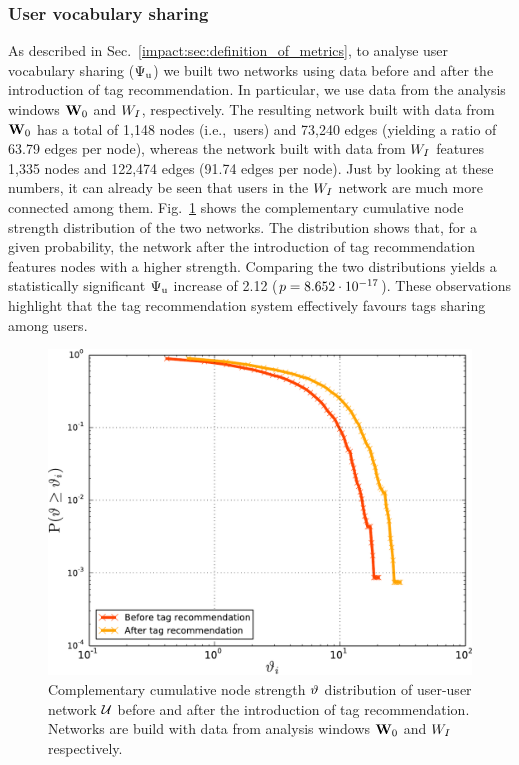 \subsubsection{User vocabulary sharing}
\label{impact:sec:vocabulary_sharing_users}
As described in Sec.~\ref{impact:sec:definition_of_metrics}, to analyse user vocabulary sharing ($\Psi_{\text{u}}$) we built two networks using data before and after the introduction of tag recommendation.
In particular, we use data from the analysis windows $\mathbf{W}_0$ and $W_I$, respectively. The resulting network built with data from $\mathbf{W}_0$ has a total of 1,148 nodes (i.e.,~users) and 73,240 edges (yielding a ratio of 63.79 edges per node), whereas the network built with data from $W_I$ features 1,335 nodes and 122,474 edges (91.74 edges per node). Just by looking at these numbers, it can already be seen that users in the $W_I$ network are much more connected among them. Fig.~\ref{impact:fig:users_graph_strength} shows the complementary cumulative node strength distribution of the two networks. The distribution shows that, for a given probability, the network after the introduction of tag recommendation features nodes with a higher strength. Comparing the two distributions yields a statistically significant $\Psi_{\text{u}}$ increase of 2.12 ($p = 8.652\cdot 10^{-17}$). 
These observations highlight that the tag recommendation system effectively favours tags sharing among users. 

\begin{figure}
\centerline{\includegraphics[width=0.66\columnwidth]{ch05_impact/pics/fig07_users_graph_strength}}
\caption[Complementary cumulative node strength distribution of user-user network]{
Complementary cumulative node strength $\vartheta$ distribution of user-user network $\mathcal{U}$ before and after the introduction of tag recommendation. Networks are build with data from analysis windows $\mathbf{W}_0$ and $W_I$ respectively.}
\label{impact:fig:users_graph_strength}
\end{figure}


